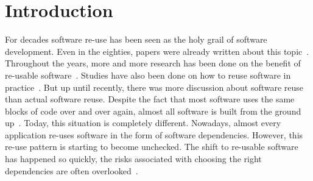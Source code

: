 \chapter{Introduction}


For decades software re-use has been seen as the holy grail of software development. Even in the eighties, papers were already written about this topic~\cite{standish1984essay}. Throughout the years, more and more research has been done on the benefit of re-usable software~\cite{jacobson1997software}. Studies have also been done on how to reuse software in practice~\cite{reifer1997practical}. But up until recently, there was more discussion about software reuse than actual software reuse. Despite the fact that most software uses the same blocks of code over and over again, almost all software is built from the ground up~\cite{frakes2005software}. Today, this situation is completely different. Nowadays, almost every application re-uses software in the form of software dependencies. However, this re-use pattern is starting to become unchecked. The shift to re-usable software has happened so quickly, the risks associated with choosing the right dependencies are often overlooked~\cite{cox2019surviving}. 







